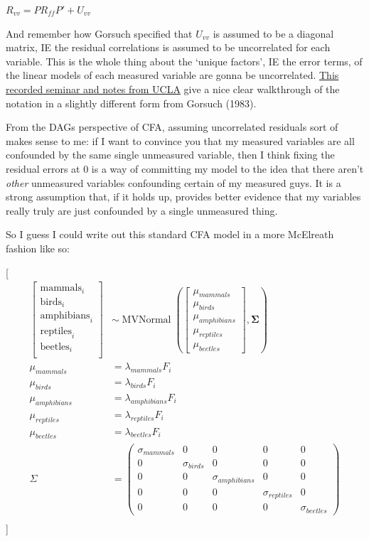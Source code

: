 \documentclass[
  letterpaper,
  DIV=11,
  numbers=noendperiod]{scrreprt}
\begin{document}
\(R_{vv} = PR_{ff}P' + U_{vv}\)

And remember how Gorsuch specified that \(U_{vv}\) is assumed to be a
diagonal matrix, IE the residual correlations is assumed to be
uncorrelated for each variable. This is the whole thing about the
`unique factors', IE the error terms, of the linear models of each
measured variable are gonna be uncorrelated.
\href{https://stats.oarc.ucla.edu/r/seminars/rcfa/}{This recorded
seminar and notes from UCLA} give a nice clear walkthrough of the
notation in a slightly different form from Gorsuch (1983).

From the DAGs perspective of CFA, assuming uncorrelated residuals sort
of makes sense to me: if I want to convince you that my measured
variables are all confounded by the same single unmeasured variable,
then I think fixing the residual errors at 0 is a way of committing my
model to the idea that there aren't \emph{other} unmeasured variables
confounding certain of my measured guys. It is a strong assumption that,
if it holds up, provides better evidence that my variables really truly
are just confounded by a single unmeasured thing.

So I guess I could write out this standard CFA model in a more McElreath
fashion like so:

{[} \begin{align*}
\begin{bmatrix} \text{mammals}_i \\ \text{birds}_i \\ \text{amphibians}_i \\ \text{reptiles}_i \\ \text{beetles}_i \\ \end{bmatrix} & \sim
\operatorname{MVNormal} \left( \begin{bmatrix} \mu_{mammals} \\ \mu_{birds} \\ \mu_{amphibians} \\ \mu_{reptiles} \\ \mu_{beetles} \end{bmatrix}, \mathbf{\Sigma} \right)\\
\mu_{mammals} & = \lambda_{mammals} F_i \\
\mu_{birds} & = \lambda_{birds} F_i \\
\mu_{amphibians} & = \lambda_{amphibians} F_i \\
\mu_{reptiles} & = \lambda_{reptiles} F_i \\
\mu_{beetles} & = \lambda_{beetles} F_i \\
\Sigma & = \begin{pmatrix} 
\sigma_{mammals}&0 &0 &0 &0 \\ 
0 & \sigma_{birds} &0 &0 &0 \\ 
0 & 0 & \sigma_{amphibians} &0 &0 \\ 
0 & 0 & 0 & \sigma_{reptiles} &0 \\ 
0 & 0 & 0 & 0 & \sigma_{beetles} 
\end{pmatrix} \\
\end{align*} {]}
\end{document}
